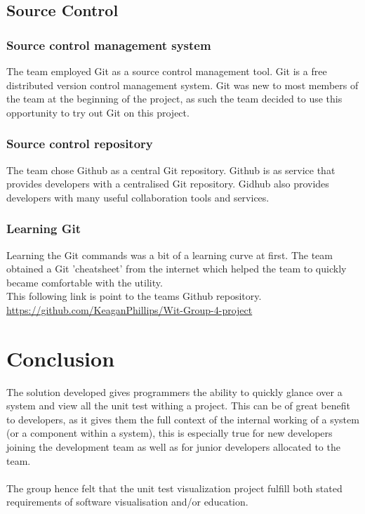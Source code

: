 \documentclass[a4paper,12pt]{article}
\begin{document}
\subsection{Source Control}
\subsubsection{Source control management system}
The team employed Git\cite{gitref} as a source control management tool. Git is a free distributed version control management system. Git was new to most members of the team at the beginning of the project, as such the team decided to use this opportunity to try out Git on this project.
\subsubsection{Source control repository}
The team chose Github\cite{github} as a central Git repository. Github\cite{github} is as service that provides developers with a centralised Git\cite{gitref} repository. Gidhub also provides developers with many useful collaboration tools and services. 
\subsubsection{Learning Git}
Learning the Git commands was a bit of a learning curve at first. The team obtained a Git 'cheatsheet' from the internet which helped the team to quickly became comfortable with the utility.\\
\linebreak
This following link is point to the teams Github repository.\\ 
\url{https://github.com/KeaganPhillips/Wit-Group-4-project}


\section{Conclusion}
The solution developed gives programmers the ability to quickly glance over a system and view all the unit test withing a project. This can be of great benefit to developers, as it gives them the full context of the internal working of a system (or a component within a system), this is especially true for new developers joining the development team as well as for junior developers allocated to the team.\\
\\
The group hence felt that the unit test visualization project fulfill both stated requirements of software visualisation and/or education.
\end{document}
